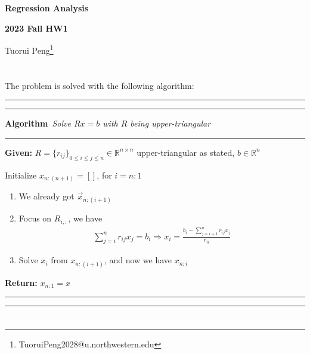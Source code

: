 \documentclass[11pt,a4paper]{ctexart}
\numberwithin{equation}{section}%
\newenvironment{algorithm}[1]{\vspace{12pt} \hrule\hrule \vspace{3pt} \noindent\textbf{\color[HTML]{E63F00}Algorithm } \,\textit{#1} \vspace{3pt} \hrule\vspace{6pt}
}{\vspace{6pt}\hrule\hrule \vspace{12pt}} %
\begin{document}
\begin{center}\thispagestyle{plain}
    {\LARGE\textbf{Regression Analysis}}

    {\Large\textbf{2023 Fall HW1}}

    Tuorui Peng\footnote{TuoruiPeng2028@u.northwestern.edu} 
\end{center}

\thispagestyle{myheadings}

\pagestyle{myheadings}




\section{}
The problem is solved with the following algorithm:
\begin{algorithm}{Solve $ Rx=b $ with $ R $ being upper-triangular}
    \textbf{Given:} $ R = \{r_{ij}\}_{0\leq i\leq j\leq n} \in \mathbb{R}^{n\times n}$ upper-triangular as stated, $ b\in \mathbb{R}^n $

    Initialize $ x_{n:(n+1)} = []$, for $ i=n:1 $

    \begin{enumerate}[topsep=2pt,itemsep=2pt]
        \item We already got $ \vec{x}_{n:(i+1)} $
        \item Focus on $ R_{i,:} $, we have
        \begin{align*}
            \sum_{j=i}^n r_{ij}x_j = b_i \Rightarrow x_i = \frac{b_i - \sum_{j=i+1}^n r_{ij}x_j}{r_{ii}}
        \end{align*}
        \item Solve $ x_{i} $ from $ x_{n:(i+1)} $, and now we have $ x_{n:i} $
    \end{enumerate}
    
    \textbf{Return:} $ x_{n:1}=x $
    
\end{algorithm}
    
\section{}
\end{document}
